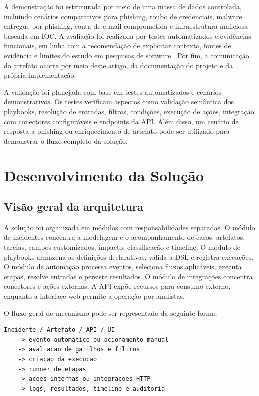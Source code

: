 \documentclass[article,a4paper,12pt,english,brazil,sumario=tradicional]{abntex2}
\begin{document}
A demonstração foi estruturada por meio de uma massa de dados controlada, incluindo cenários comparativos para phishing, roubo de credenciais, malware entregue por phishing, conta de e-mail comprometida e infraestrutura maliciosa baseada em IOC. A avaliação foi realizada por testes automatizados e evidências funcionais, em linha com a recomendação de explicitar contexto, fontes de evidência e limites do estudo em pesquisas de software \cite{runeson2009}. Por fim, a comunicação do artefato ocorre por meio deste artigo, da documentação do projeto e da própria implementação.

A validação foi planejada com base em testes automatizados e cenários demonstrativos. Os testes verificam aspectos como validação semântica dos playbooks, resolução de entradas, filtros, condições, execução de ações, integração com conectores configuráveis e endpoints da API. Além disso, um cenário de resposta a phishing ou enriquecimento de artefato pode ser utilizado para demonstrar o fluxo completo da solução.

\section{Desenvolvimento da Solução}

\subsection{Visão geral da arquitetura}

A solução foi organizada em módulos com responsabilidades separadas. O módulo de incidentes concentra a modelagem e o acompanhamento de casos, artefatos, tarefas, campos customizados, impacto, classificação e timeline. O módulo de playbooks armazena as definições declarativas, valida a DSL e registra execuções. O módulo de automação processa eventos, seleciona fluxos aplicáveis, executa etapas, resolve entradas e persiste resultados. O módulo de integrações concentra conectores e ações externas. A API expõe recursos para consumo externo, enquanto a interface web permite a operação por analistas.

O fluxo geral do mecanismo pode ser representado da seguinte forma:

\begin{lstlisting}
Incidente / Artefato / API / UI
    -> evento automatico ou acionamento manual
    -> avaliacao de gatilhos e filtros
    -> criacao da execucao
    -> runner de etapas
    -> acoes internas ou integracoes HTTP
    -> logs, resultados, timeline e auditoria
\end{lstlisting}
\end{document}
